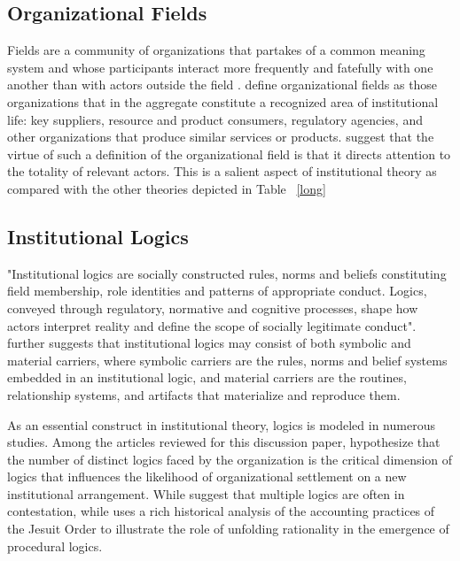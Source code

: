 \documentclass[12pt]{article}
\begin{document}
\subsection{Organizational Fields}
Fields are a community of organizations that partakes of a common meaning system and whose participants interact more frequently and fatefully with one another than with actors outside the field \citep{Scott1995}. \cite{Dimaggio1983} define organizational fields as those organizations that in the aggregate constitute a recognized area of institutional life: key suppliers, resource and product consumers, regulatory agencies, and other organizations that produce similar services or products. \cite{Dimaggio1983} suggest that the virtue of such a definition of the organizational field is that it directs attention to the totality of relevant actors. This is a salient aspect of institutional theory as compared with the other theories depicted in Table ~\ref{long}

\subsection{Institutional Logics}
"Institutional logics are socially constructed rules, norms and beliefs constituting field membership, role identities and patterns of appropriate conduct. Logics, conveyed through regulatory, normative and cognitive processes, shape how actors interpret reality and define the scope of socially legitimate conduct"\citep{Friedland1991}.  \cite{Friedland1991} further suggests that institutional logics may consist of both symbolic and material carriers, where symbolic carriers are the rules, norms and belief systems embedded in an institutional logic, and material carriers are the routines, relationship systems, and artifacts that materialize and reproduce them. 

As an essential construct in institutional theory, logics is modeled in numerous studies. Among the articles reviewed for this discussion paper, \cite{Helms2012} hypothesize that the number of distinct logics faced by the organization is the critical dimension of logics that influences the likelihood of organizational settlement on a new institutional arrangement. While \cite{Dunn2010} suggest that multiple logics are often in contestation, while \cite{Quattrone2015} uses a rich historical analysis of the accounting practices of the Jesuit Order to illustrate the role of unfolding rationality in the emergence of procedural logics.
\end{document}
